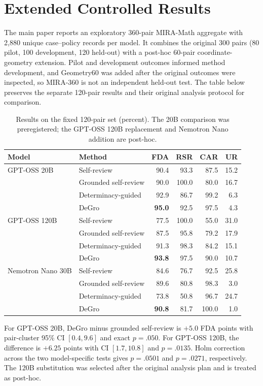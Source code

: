 \documentclass[10pt]{article}
\begin{document}
\section{Extended Controlled Results}
The main paper reports an exploratory 360-pair MIRA-Math aggregate with 2,880 unique case--policy records per model. It combines the original 300 pairs (80 pilot, 100 development, 120 held-out) with a post-hoc 60-pair coordinate-geometry extension. Pilot and development outcomes informed method development, and Geometry60 was added after the original outcomes were inspected, so MIRA-360 is not an independent held-out test. The table below preserves the separate 120-pair results and their original analysis protocol for comparison.
\begin{table}[h]
\centering
\caption{Results on the fixed 120-pair set (percent). The 20B comparison was preregistered; the GPT-OSS 120B replacement and Nemotron Nano addition are post-hoc.}
\begin{tabular}{@{}llrrrr@{}}
\toprule
Model & Method & FDA & RSR & CAR & UR\\
\midrule
GPT-OSS 20B & Self-review & 90.4 & 93.3 & 87.5 & 15.2\\
 & Grounded self-review & 90.0 & 100.0 & 80.0 & 16.7\\
 & Determinacy-guided & 92.9 & 86.7 & 99.2 & 6.3\\
 & DeGro & \textbf{95.0} & 92.5 & 97.5 & 4.3\\
\midrule
GPT-OSS 120B & Self-review & 77.5 & 100.0 & 55.0 & 31.0\\
 & Grounded self-review & 87.5 & 95.8 & 79.2 & 17.9\\
 & Determinacy-guided & 91.3 & 98.3 & 84.2 & 15.1\\
 & DeGro & \textbf{93.8} & 97.5 & 90.0 & 10.7\\
\midrule
Nemotron Nano 30B & Self-review & 84.6 & 76.7 & 92.5 & 25.8\\
 & Grounded self-review & 89.6 & 80.8 & 98.3 & 3.0\\
 & Determinacy-guided & 73.8 & 50.8 & 96.7 & 24.7\\
 & DeGro & \textbf{90.8} & 81.7 & 100.0 & 1.0\\
\bottomrule
\end{tabular}
\end{table}
For GPT-OSS 20B, DeGro minus grounded self-review is $+5.0$ FDA points with pair-cluster 95\% CI $[0.4,9.6]$ and exact $p=.050$. For GPT-OSS 120B, the difference is $+6.25$ points with CI $[1.7,10.8]$ and $p=.0135$. Holm correction across the two model-specific tests gives $p=.0501$ and $p=.0271$, respectively. The 120B substitution was selected after the original analysis plan and is treated as post-hoc.
\end{document}
